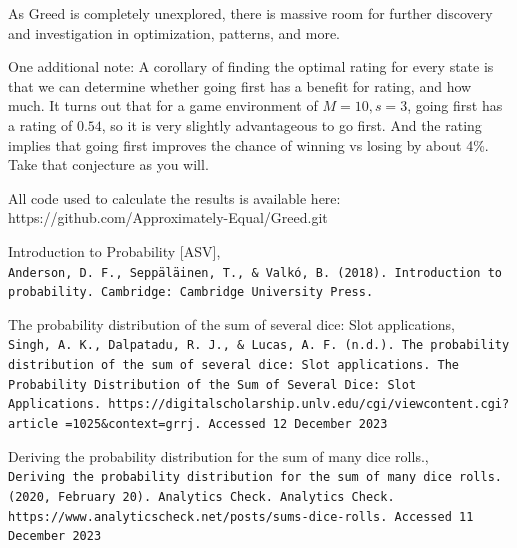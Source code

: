 \documentclass[a4paper]{article}
\begin{document}
As Greed is completely unexplored, there is massive room for further discovery and investigation in optimization, patterns, and more.


One additional note: A corollary of finding the optimal rating for every state is that we can determine whether going first has a benefit for rating, and how much. It turns out that for a game environment of $M = 10, s = 3$, going first has a rating of $0.54$, so it is very slightly advantageous to go first. And the rating implies that going first improves the chance of winning vs losing by about 4\%. Take that conjecture as you will.


All code used to calculate the results is available here: https://github.com/Approximately-Equal/Greed.git


\begin{thebibliography}{3}

Introduction to Probability [ASV],
\\\texttt{Anderson, D. F., Seppäläinen, T., \& Valkó, B. (2018). Introduction to probability. Cambridge: Cambridge University Press.}


The probability distribution of the sum of several dice: Slot applications,
\\\texttt{Singh, A. K., Dalpatadu, R. J., \& Lucas, A. F. (n.d.). The probability distribution of the sum of several dice: Slot applications. The Probability Distribution of the Sum of Several Dice: Slot Applications. https://digitalscholarship.unlv.edu/cgi/viewcontent.cgi?article =1025\&context=grrj. Accessed 12 December 2023}

Deriving the probability distribution for the sum of many dice rolls.,
\\\texttt{Deriving the probability distribution for the sum of many dice rolls. (2020, February 20). Analytics Check. Analytics Check. https://www.analyticscheck.net/posts/sums-dice-rolls. Accessed 11 December 2023}

\end{thebibliography}
\end{document}
